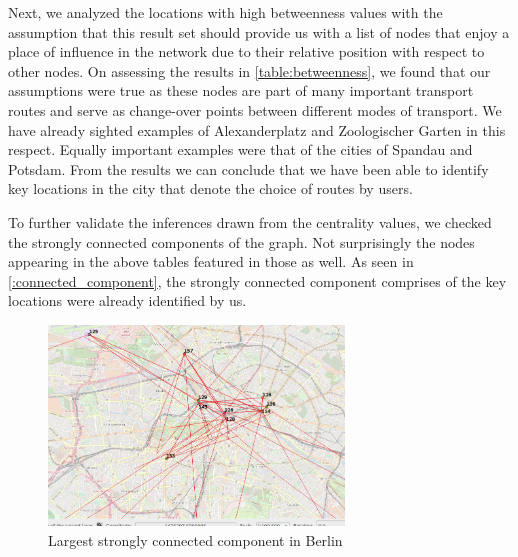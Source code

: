 Next, we analyzed the locations with high betweenness values with the assumption that this result set should provide us with a list of nodes that enjoy a place of influence in the network due to their relative position with  respect to other nodes. On assessing the results in \autoref{table:betweenness}, we found that our assumptions were true as these nodes are part of many important transport routes and serve as change-over points between different modes of transport. We have already sighted examples of Alexanderplatz and Zoologischer Garten in this respect. Equally important examples were that of the cities of Spandau and Potsdam. From the results we can conclude that we have been able to identify key locations in the city that denote the choice of routes by users.

To further validate the inferences drawn from the centrality values, we checked the strongly connected components of the graph. Not surprisingly the nodes appearing in the above tables featured in those as well. As seen in 
\autoref{:connected_component}, the strongly connected component comprises of the key locations were already identified by us. 
\begin{figure}[!ht]
	\centering
	\includegraphics[width=0.7\textwidth]{images/connected_component.png}
	\caption{Largest strongly connected component in Berlin}
	\label{:connected_component}
\end{figure}  
\FloatBarrier

